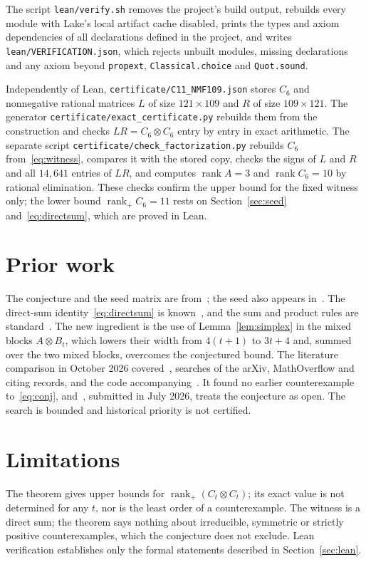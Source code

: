 \documentclass[11pt]{article}
\theoremstyle{remark}
\newcommand{\code}[1]{\nolinkurl{#1}}
\newcommand{\rk}{\operatorname{rank}}
\newcommand{\rp}{\operatorname{rank}_+}
\begin{document}
The script \code{lean/verify.sh} removes the project's build output, rebuilds every module with Lake's local artifact cache disabled, prints the types and axiom dependencies of all declarations defined in the project, and writes \code{lean/VERIFICATION.json}, which rejects unbuilt modules, missing declarations and any axiom beyond \code{propext}, \code{Classical.choice} and \code{Quot.sound}.

Independently of Lean, \code{certificate/C11\_NMF109.json} stores $C_6$ and nonnegative rational matrices $L$ of size $121\times109$ and $R$ of size $109\times121$. The generator \code{certificate/exact\_certificate.py} rebuilds them from the construction and checks $LR=C_6\otimes C_6$ entry by entry in exact arithmetic. The separate script \code{certificate/check\_factorization.py} rebuilds $C_6$ from~\eqref{eq:witness}, compares it with the stored copy, checks the signs of $L$ and $R$ and all $14{,}641$ entries of $LR$, and computes $\rk A=3$ and $\rk C_6=10$ by rational elimination. These checks confirm the upper bound for the fixed witness only; the lower bound $\rp C_6=11$ rests on Section~\ref{sec:seed} and~\eqref{eq:directsum}, which are proved in Lean.

\section{Prior work}\label{sec:prior}

The conjecture and the seed matrix are from~\cite{VGGT}; the seed also appears in~\cite{BCR}. The direct-sum identity~\eqref{eq:directsum} is known~\cite{QCL}, and the sum and product rules are standard~\cite{CR}. The new ingredient is the use of Lemma~\ref{lem:simplex} in the mixed blocks $A\otimes B_t$, which lowers their width from $4(t+1)$ to $3t+4$ and, summed over the two mixed blocks, overcomes the conjectured bound. The literature comparison in October 2026 covered~\cite{VGGT,CC,BCR,QCL}, searches of the arXiv, MathOverflow and citing records, and the code accompanying~\cite{VGGT}. It found no earlier counterexample to~\eqref{eq:conj}, and~\cite{CC}, submitted in July 2026, treats the conjecture as open. The search is bounded and historical priority is not certified.

\section{Limitations}\label{sec:limits}

The theorem gives upper bounds for $\rp(C_t\otimes C_t)$; its exact value is not determined for any $t$, nor is the least order of a counterexample. The witness is a direct sum; the theorem says nothing about irreducible, symmetric or strictly positive counterexamples, which the conjecture does not exclude. Lean verification establishes only the formal statements described in Section~\ref{sec:lean}.
\end{document}
